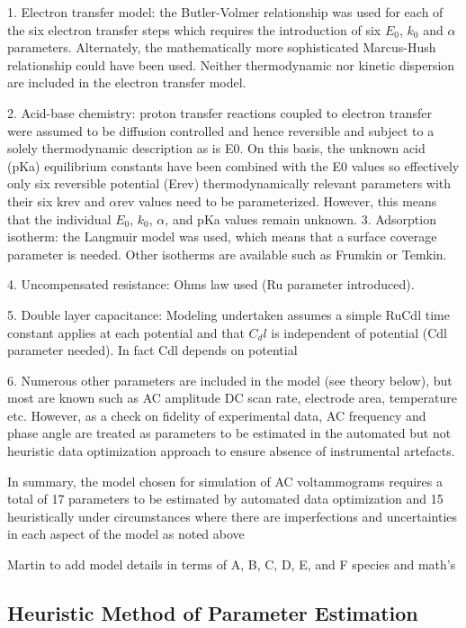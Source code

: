 \documentclass[a4paper, 12pt]{article}
\begin{document}
1. Electron transfer model: the Butler-Volmer relationship was used for each of 
the six electron transfer steps which requires the introduction of six $E_0$, 
$k_0$ and $\alpha$ parameters.  Alternately, the mathematically more 
sophisticated Marcus-Hush relationship could have been used. Neither 
thermodynamic nor kinetic dispersion are included in the electron transfer 
model.

2. Acid-base chemistry: proton transfer reactions coupled to electron transfer 
were assumed to be diffusion controlled and hence reversible and subject to a 
solely thermodynamic description as is E0. On this basis, the unknown acid (pKa) 
equilibrium constants have been combined with the E0 values so effectively only 
six reversible potential (Erev) thermodynamically relevant parameters with their 
six krev and $\alpha$rev values need to be parameterized. However, this means 
that the individual $E_0$, $k_0$, $\alpha$, and pKa values remain unknown.  3.  
Adsorption isotherm: the Langmuir model was used, which means that a surface 
coverage parameter is needed. Other isotherms are available such as Frumkin or 
Temkin.

4. Uncompensated resistance: Ohms law used (Ru parameter introduced).

5. Double layer capacitance: Modeling undertaken assumes a simple RuCdl time 
constant   applies at each potential and that $C_dl$ is independent of potential 
(Cdl parameter needed). In fact Cdl depends on potential

6. Numerous other parameters are included in the model (see theory below), but 
most are known such as AC amplitude DC scan rate, electrode area, temperature 
etc. However, as a check on fidelity of experimental data, AC frequency and 
phase angle are treated as parameters to be estimated in the automated but not 
heuristic data optimization approach to ensure absence of instrumental 
artefacts. 

In summary, the   model chosen for simulation of AC voltammograms   requires a 
total of 17 parameters to be estimated by automated data optimization and 15 
heuristically under circumstances where there are imperfections and 
uncertainties in each aspect of the model as noted above 

Martin to add model details in terms of A, B, C, D, E, and F species and math’s

\subsection{Heuristic Method of Parameter Estimation}
\end{document}
